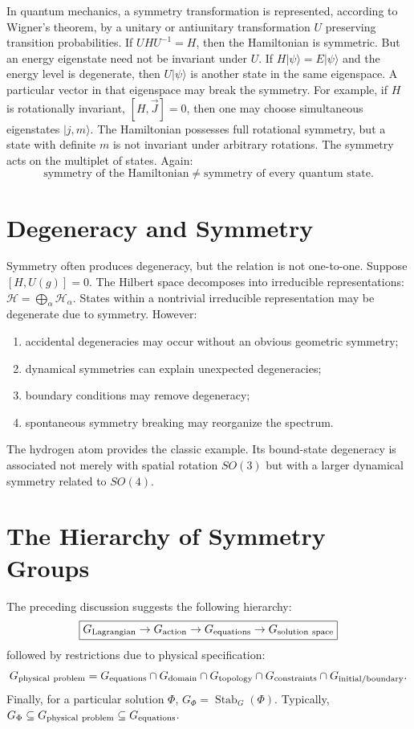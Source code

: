 In quantum mechanics, a symmetry transformation is represented, according to
Wigner's theorem, by a unitary or antiunitary transformation $U$ preserving
transition probabilities.
If $UHU^{-1}=H$,
then the Hamiltonian is symmetric.
But an energy eigenstate need not be invariant under $U$.
If $H|\psi\rangle=E|\psi\rangle$ and the energy level is degenerate, 
then $U|\psi\rangle$ is another state in the same eigenspace.
A particular vector in that eigenspace may break the symmetry.
For example, if $H$ is rotationally invariant, $[H,\vec{J}]=0$,
then one may choose simultaneous eigenstates $|j,m\rangle$.
The Hamiltonian possesses full rotational symmetry, but a state with definite
$m$ is not invariant under arbitrary rotations.
The symmetry acts on the multiplet of states.
Again:
\[
\boxed{
\text{symmetry of the Hamiltonian}
\neq
\text{symmetry of every quantum state}.
}
\]

\section{ Degeneracy and Symmetry}
\label{sp:ds}

Symmetry often produces degeneracy, but the relation is not one-to-one.
Suppose $[H,U(g)]=0$. The Hilbert space decomposes into irreducible 
representations: $\mathcal{H}=\bigoplus_\alpha\mathcal{H}_\alpha$.
States within a nontrivial irreducible representation may be degenerate due to
symmetry.
However:
\begin{enumerate}
\item accidental degeneracies may occur without an obvious geometric symmetry;
\item dynamical symmetries can explain unexpected degeneracies;
\item boundary conditions may remove degeneracy;
\item spontaneous symmetry breaking may reorganize the spectrum.
\end{enumerate}
The hydrogen atom provides the classic example.  Its bound-state degeneracy is
associated not merely with spatial rotation $SO(3)$ but with a larger dynamical
symmetry related to $SO(4)$.

\section{ The Hierarchy of Symmetry Groups}
\label{sp:hs}

The preceding discussion suggests the following hierarchy:
\[\boxed{G_{\rm Lagrangian}\rightarrow G_{\rm action}\rightarrow
G_{\rm equations}\rightarrow G_{\rm solution\ space}}\]
followed by restrictions due to physical specification:
\[G_{\rm physical\ problem}=G_{\rm equations}\cap G_{\rm domain}
\cap G_{\rm topology} \cap G_{\rm constraints}\cap G_{\rm initial/boundary}.\]
Finally, for a particular solution $\Phi$, $G_\Phi=\operatorname{Stab}_G(\Phi)$.
Typically,$G_\Phi\subseteq G_{\rm physical\ problem}\subseteq G_{\rm equations}$.

